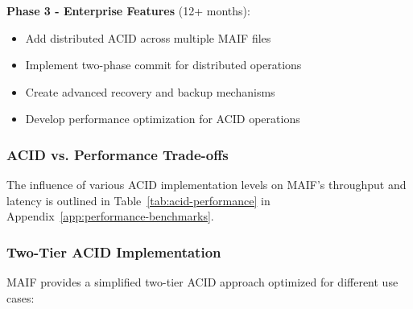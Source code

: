 \documentclass[conference]{IEEEtran}
\begin{document}
\begin{itemize}[leftmargin=*]
\textbf{Phase 3 - Enterprise Features} (12+ months):
\begin{itemize}[leftmargin=*]
\item Add distributed ACID across multiple MAIF files
\item Implement two-phase commit for distributed operations
\item Create advanced recovery and backup mechanisms
\item Develop performance optimization for ACID operations
\end{itemize}

\subsubsection{ACID vs. Performance Trade-offs}
The influence of various ACID implementation levels on MAIF's throughput and latency is outlined in Table~\ref{tab:acid-performance} in Appendix~\ref{app:performance-benchmarks}.


\subsubsection{Two-Tier ACID Implementation}

MAIF provides a simplified two-tier ACID approach optimized for different use cases:


\end{itemize}
\end{document}
